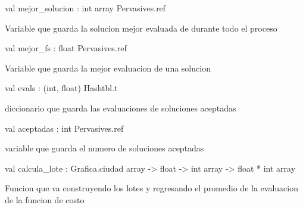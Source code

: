 \documentclass[11pt]{article}
\begin{document}
\ocamldocvspace{0.5cm}



\label{val:Umbrales.mejor-underscoresolucion}\begin{ocamldoccode}
val mejor_solucion : int array Pervasives.ref
\end{ocamldoccode}
\begin{ocamldocdescription}
Variable que guarda la solucion mejor evaluada de durante todo el proceso


\end{ocamldocdescription}




\label{val:Umbrales.mejor-underscorefs}\begin{ocamldoccode}
val mejor_fs : float Pervasives.ref
\end{ocamldoccode}
\begin{ocamldocdescription}
Variable que guarda la mejor evaluacion de una solucion


\end{ocamldocdescription}




\label{val:Umbrales.evals}\begin{ocamldoccode}
val evals : (int, float) Hashtbl.t
\end{ocamldoccode}
\begin{ocamldocdescription}
diccionario que guarda las evaluaciones de soluciones aceptadas


\end{ocamldocdescription}




\label{val:Umbrales.aceptadas}\begin{ocamldoccode}
val aceptadas : int Pervasives.ref
\end{ocamldoccode}
\begin{ocamldocdescription}
variable que guarda el numero de soluciones aceptadas


\end{ocamldocdescription}




\label{val:Umbrales.calcula-underscorelote}\begin{ocamldoccode}
val calcula_lote :
  Grafica.ciudad array -> float -> int array -> float * int array
\end{ocamldoccode}
\begin{ocamldocdescription}
Funcion que va construyendo los lotes y regresando el promedio de la evaluacion de la funcion de costo


\end{ocamldocdescription}
\end{document}
